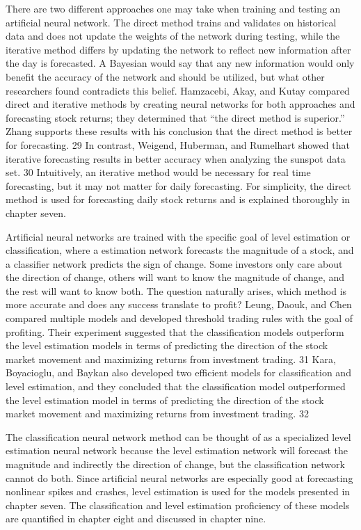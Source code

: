 \documentclass[../main.tex]{subfiles}
\begin{document}
    There are two different approaches one may take when training and testing an artificial neural network.
    The direct method trains and validates on historical data and does not update the weights of the network during testing, while the iterative method differs by updating the network to reflect new information after the day is forecasted.
    A Bayesian would say that any new information would only benefit the accuracy of the network and should be utilized, but what other researchers found contradicts this belief.
    Hamzacebi, Akay, and Kutay compared direct and iterative methods by creating neural networks for both approaches and forecasting stock returns; they determined that “the direct method is superior.”
    Zhang supports these results with his conclusion that the direct method is better for forecasting. 29
    In contrast, Weigend, Huberman, and Rumelhart showed that iterative forecasting results in better accuracy when analyzing the sunspot data set. 30
    Intuitively, an iterative method would be necessary for real time forecasting, but it may not matter for daily forecasting.
    For simplicity, the direct method is used for forecasting daily stock returns and is explained thoroughly in chapter seven.

    Artificial neural networks are trained with the specific goal of level estimation or classification, where a estimation network forecasts the magnitude of a stock, and a classifier network predicts the sign of change.
    Some investors only care about the direction of change, others will want to know the magnitude of change, and the rest will want to know both.
    The question naturally arises, which method is more accurate and does any success translate to profit?
    Leung, Daouk, and Chen compared multiple models and developed threshold trading rules with the goal of profiting.
    Their experiment suggested that the classification models outperform the level estimation models in terms of predicting the direction of the stock market movement and maximizing returns from investment trading. 31
    Kara, Boyacioglu, and Baykan also developed two efficient models for classification and level estimation, and they concluded that the classification model outperformed the level estimation model in terms of predicting the direction of the stock market movement and maximizing returns from investment trading. 32

    The classification neural network method can be thought of as a specialized level estimation neural network because the level estimation network will forecast the magnitude and indirectly the direction of change, but the classification network cannot do both.
    Since artificial neural networks are especially good at forecasting nonlinear spikes and crashes, level estimation is used for the models presented in chapter seven.
    The classification and level estimation proficiency of these models are quantified in chapter eight and discussed in chapter nine.
\end{document}

